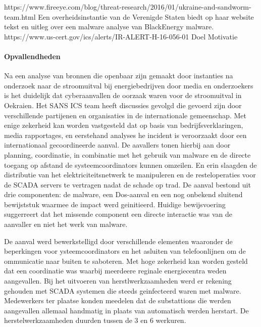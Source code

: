 {https://www.fireeye.com/blog/threat-research/2016/01/ukraine-and-sandworm-team.html
Een overheidsinstantie van de Verenigde Staten biedt op haar website tekst en uitleg over een
malware analyse van BlackEnergy malware.
https://www.us-cert.gov/ics/alerts/IR-ALERT-H-16-056-01
Doel
Motivatie
 \paragraph{Opvallendheden}


Na een analyse van bronnen die openbaar zijn gemaakt door instanties na onderzoek naar de
stroomuitval bij energiebedrijven door media en onderzoekers is het duidelijk dat cyberaanvallen de
oorzaak waren voor de stroomuitval in Oekraien. Het SANS ICS team heeft discussies gevolgd die
gevoerd zijn door verschillende partijenen en organisaties in de internationale gemeenschap. Met
enige zekerheid kan worden vastgesteld dat op basis van bedrijfsverklaringen, media rapportages, en
eerstehand analyses he incident is veroorzaakt door een internationaal gecoordineerde aanval.
De aavallers tonen hierbij aan door planning, coordinatie, in combinatie met het gebruik van
malware en de directe toegang op afstand de systeemcoordinators kunnen omzeilen. En erin
slaagden de distributie van het elektriciteitsnetwerk te manipuleren en de resteloperaties voor de
SCADA servers te vertragen nadat de schade op trad. De aanval bestond uit drie componenten: de
malware, een Dos-aanval en een nog onbekend sluitend bewijststuk waarmee de impact werd
geinitieerd. Huidige bewijsvoering suggerreert dat het missende component een directe interactie
was van de aanvaller en niet het werk van malware.

De aanval werd bewerkstelligd door verschillende elementen waaronder de beperkingen voor
ysteemcoordinators en het asluiten van telefoonlijnen om de ommunicatie naar buiten te saboteren.
Met hoge zekerheid kan worden gesteld dat een coordinatie was waarbij meerdeere reginale
energiecentra weden aangevallen.
Bij het uitvoeren van herstlwerkzaamheden werd er rekening gehouden met SCADA systemen die
steeds geinfecteerd waren met malware. Medewerkers ter plaatse konden meedelen dat de
substattions die werden aangevallen allemaal handmatig in plaats van automatisch werden herstart.
De herstelwerkzaamheden duurden tussen de 3 en 6 werkuren.

}
